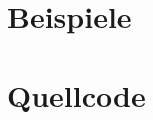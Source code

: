 \documentclass[a4paper,10pt,ngerman]{scrartcl}
\begin{document}
\section{Beispiele}

\section{Quellcode}




\end{document}
